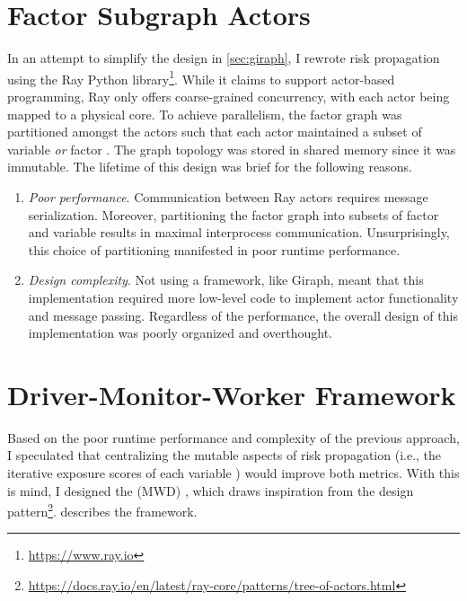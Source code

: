 \section{Factor Subgraph Actors}\label{sec:subgraph-actors}

In an attempt to simplify the design in \cref{sec:giraph}, I rewrote risk propagation using the Ray Python library\footnote{\url{https://www.ray.io}}. While it claims to support actor-based programming, Ray only offers coarse-grained concurrency, with each actor being mapped to a physical core. To achieve parallelism, the factor graph was partitioned amongst the actors such that each actor maintained a subset of variable \verticesName \emph{or} factor \verticesName. The graph topology was stored in shared memory since it was immutable. The lifetime of this design was brief for the following reasons.
  \begin{enumerate}
    \item \emph{Poor performance}. Communication between Ray actors requires message serialization. Moreover, partitioning the factor graph into subsets of factor \verticesName and variable \verticesName results in maximal interprocess communication. Unsurprisingly, this choice of partitioning manifested in poor runtime performance.
    \item \emph{Design complexity}. Not using a framework, like Giraph, meant that this implementation required more low-level code to implement actor functionality and message passing. Regardless of the performance, the overall design of this implementation was poorly organized and overthought.
  \end{enumerate}

\section{Driver-Monitor-Worker Framework}\label{sec:mwd-framework}

Based on the poor runtime performance and complexity of the previous approach, I speculated that centralizing the mutable aspects of risk propagation (i.e., the iterative exposure scores of each variable \vertexName) would improve both metrics. With this is mind, I designed the  (MWD) , which draws inspiration from the  design pattern\footnote{\url{https://docs.ray.io/en/latest/ray-core/patterns/tree-of-actors.html}}.  describes the framework.

